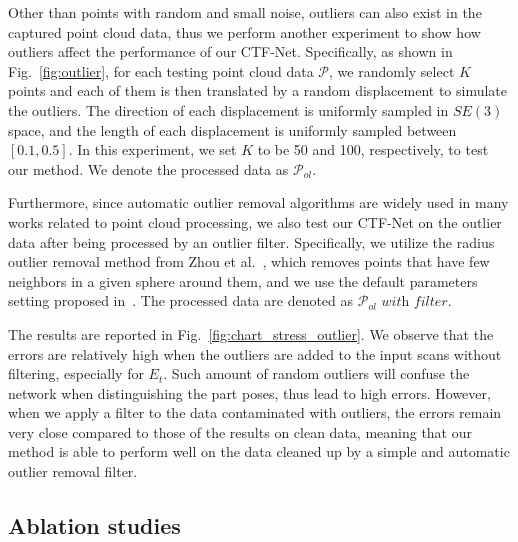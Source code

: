 Other than points with random and small noise, outliers can also exist in the captured point cloud data, thus we perform another experiment to show how outliers affect the performance of our CTF-Net.
Specifically, as shown in Fig.~\ref{fig:outlier}, for each testing point cloud data $\mathcal{P}$, we randomly select $K$ points and each of them is then translated by a random displacement to simulate the outliers. The direction of each displacement is uniformly sampled in $SE(3)$ space, and the length of each displacement is uniformly sampled between $[0.1,0.5]$. In this experiment, we set $K$ to be 50 and 100, respectively, to test our method. We denote the processed data as $\mathcal{P}_{ol}$. 



Furthermore, since automatic outlier removal algorithms are widely used in many works related to point cloud processing, we also test our CTF-Net on the outlier data after being processed by an outlier filter. Specifically, we utilize the radius outlier removal method from Zhou et al.~, which removes points that have few neighbors in a given sphere around them,  and we use the default parameters setting proposed in~. The processed data are denoted as $\mathcal{P}_{ol}\textit{ with filter}$.

The results are reported in Fig.~\ref{fig:chart_stress_outlier}. We observe that the errors are relatively high when the outliers are added to the input scans without filtering, especially for $E_t$. Such amount of random outliers will confuse the network when distinguishing the part poses, thus lead to high errors. However, when we apply a filter to the data contaminated with outliers, the errors remain very close compared to those of the results on clean data, meaning that our method is able to perform well on the data cleaned up by a simple and automatic outlier removal filter.


\subsection{Ablation studies} \label{sec:ablation}

